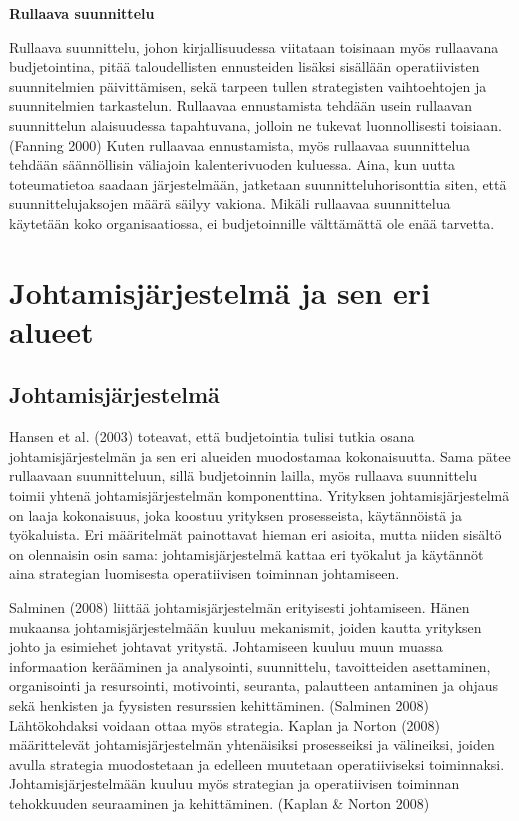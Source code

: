 \documentclass[12pt,a4paper,oneside,pdftex]{report}
\begin{document}
\textbf{Rullaava suunnittelu}

Rullaava suunnittelu, johon kirjallisuudessa viitataan toisinaan myös rullaavana budjetointina, pitää taloudellisten ennusteiden lisäksi sisällään operatiivisten suunnitelmien päivittämisen, sekä tarpeen tullen strategisten vaihtoehtojen ja suunnitelmien tarkastelun. Rullaavaa ennustamista tehdään usein rullaavan suunnittelun alaisuudessa tapahtuvana, jolloin ne tukevat luonnollisesti toisiaan. (Fanning 2000) Kuten rullaavaa ennustamista, myös rullaavaa suunnittelua tehdään säännöllisin väliajoin kalenterivuoden kuluessa. Aina, kun uutta toteumatietoa saadaan järjestelmään, jatketaan suunnitteluhorisonttia siten, että suunnittelujaksojen määrä säilyy vakiona. Mikäli rullaavaa suunnittelua käytetään koko organisaatiossa, ei budjetoinnille välttämättä ole enää tarvetta.

\chapter{Johtamisjärjestelmä ja sen eri alueet}
\label{chapter:johtamisjärjestelmä}

\section{Johtamisjärjestelmä}

Hansen et al. (2003) toteavat, että budjetointia tulisi tutkia osana johtamisjärjestelmän ja sen eri alueiden muodostamaa kokonaisuutta. Sama pätee rullaavaan suunnitteluun, sillä budjetoinnin lailla, myös rullaava suunnittelu toimii yhtenä johtamisjärjestelmän komponenttina. Yrityksen johtamisjärjestelmä on laaja kokonaisuus, joka koostuu yrityksen prosesseista, käytännöistä ja työkaluista. Eri määritelmät painottavat hieman eri asioita, mutta niiden sisältö on olennaisin osin sama: johtamisjärjestelmä kattaa eri työkalut ja käytännöt aina strategian luomisesta operatiivisen toiminnan johtamiseen.

Salminen (2008) liittää johtamisjärjestelmän erityisesti johtamiseen. Hänen mukaansa johtamisjärjestelmään kuuluu mekanismit, joiden kautta yrityksen johto ja esimiehet johtavat yritystä. Johtamiseen kuuluu muun muassa informaation kerääminen ja analysointi, suunnittelu, tavoitteiden asettaminen, organisointi ja resursointi, motivointi, seuranta, palautteen antaminen ja ohjaus sekä henkisten ja fyysisten resurssien kehittäminen. (Salminen 2008) Lähtökohdaksi voidaan ottaa myös strategia. Kaplan ja Norton (2008) määrittelevät johtamisjärjestelmän yhtenäisiksi prosesseiksi ja välineiksi, joiden avulla strategia muodostetaan ja edelleen muutetaan operatiiviseksi toiminnaksi. Johtamisjärjestelmään kuuluu myös strategian ja operatiivisen toiminnan tehokkuuden seuraaminen ja kehittäminen. (Kaplan & Norton 2008)
\end{document}
